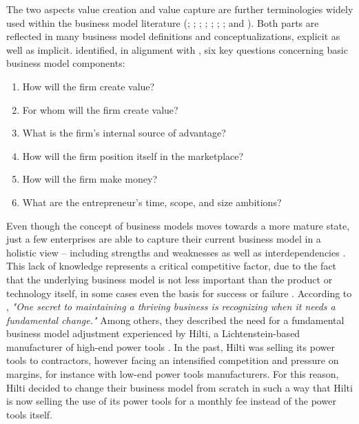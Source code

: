 The two aspects value creation and value capture are further terminologies widely used within the business model literature (\citealp[p. 511]{Amit2001}; \citealp[pp. 533-534]{Chesbrough2002}; \citealp[p. 727]{Morris2005}; \citealp[p. 202]{Shafer2005}; \citealp[p. 12]{Chesbrough2007}; \citealp[p. 52]{Johnson2008}; \citealp[p. 14]{Osterwalder2010}; and \citealp[pp. 1019-1020]{Zott2011}). Both parts are reflected in many business model definitions and conceptualizations, explicit as well as implicit. \citet[pp. 729-732]{Morris2005} identified, in alignment with \citet[pp. 49-61]{Drucker1954}, six key questions concerning basic business model components:

\begin{enumerate}[parsep=0pt, topsep=0pt, itemsep=0pt]
	\item How will the firm create value?
	\item For whom will the firm create value?
	\item What is the firm's internal source of advantage?
	\item How will the firm position itself in the marketplace?
	\item How will the firm make money?
	\item What are the entrepreneur's time, scope, and size ambitions?
\end{enumerate}

Even though the concept of business models moves towards a more mature state, just a few enterprises are able to capture their current business model in a holistic view -- including strengths and weaknesses as well as interdependencies \citep[p. 52]{Johnson2008}. This lack of knowledge represents a critical competitive factor, due to the fact that the underlying business model is not less important than the product or technology itself, in some cases even the basis for success or failure . According to \citet[p. 50]{Johnson2008}, \textit{"One secret to maintaining a thriving business is recognizing when it needs a fundamental change."} Among others, they described the need for a fundamental business model adjustment experienced by Hilti, a Lichtenstein-based manufacturer of high-end power tools \citep[pp. 54-57]{Johnson2008}. In the past, Hilti was selling its power tools to contractors, however facing an intensified competition and pressure on margins, for instance with low-end power tools manufacturers. For this reason, Hilti decided to change their business model from scratch in such a way that Hilti is now selling the use of its power tools for a monthly fee instead of the power tools itself.

